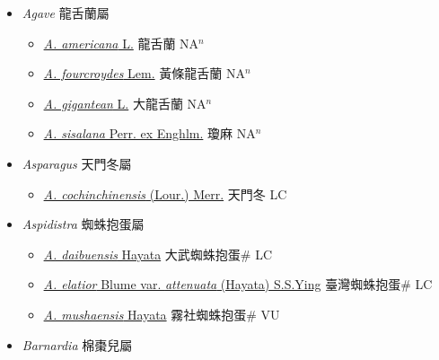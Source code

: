 
  \begin{itemize}
 \item[] \textit{Agave} 龍舌蘭屬
                    
  \begin{itemize}
        \item[] \href{http://www.theplantlist.org/tpl1.1/search?q=Agave+americana}{\textit{A. americana} L.}   龍舌蘭 NA$^n$
        \item[] \href{http://www.theplantlist.org/tpl1.1/search?q=Agave+fourcroydes}{\textit{A. fourcroydes} Lem.}   黃條龍舌蘭 NA$^n$
        \item[] \href{http://www.theplantlist.org/tpl1.1/search?q=Agave+gigantean}{\textit{A. gigantean} L.}   大龍舌蘭 NA$^n$
        \item[] \href{http://www.theplantlist.org/tpl1.1/search?q=Agave+sisalana}{\textit{A. sisalana} Perr. ex Enghlm.}   瓊麻 NA$^n$
  \end{itemize}
 \item[] \textit{Asparagus} 天門冬屬
                    
  \begin{itemize}
        \item[] \href{http://www.theplantlist.org/tpl1.1/search?q=Asparagus+cochinchinensis}{\textit{A. cochinchinensis} (Lour.) Merr.}   天門冬 LC
  \end{itemize}
 \item[] \textit{Aspidistra} 蜘蛛抱蛋屬
                    
  \begin{itemize}
        \item[] \href{http://www.theplantlist.org/tpl1.1/search?q=Aspidistra+daibuensis}{\textit{A. daibuensis} Hayata}   大武蜘蛛抱蛋\# LC
        \item[] \href{http://www.theplantlist.org/tpl1.1/search?q=Aspidistra+elatior+var.+attenuata}{\textit{A. elatior} Blume var. \textit{attenuata} (Hayata) S.S.Ying}   臺灣蜘蛛抱蛋\# LC
        \item[] \href{http://www.theplantlist.org/tpl1.1/search?q=Aspidistra+mushaensis}{\textit{A. mushaensis} Hayata}   霧社蜘蛛抱蛋\# VU
  \end{itemize}
 \item[] \textit{Barnardia} 棉棗兒屬
                    

\end{itemize}

